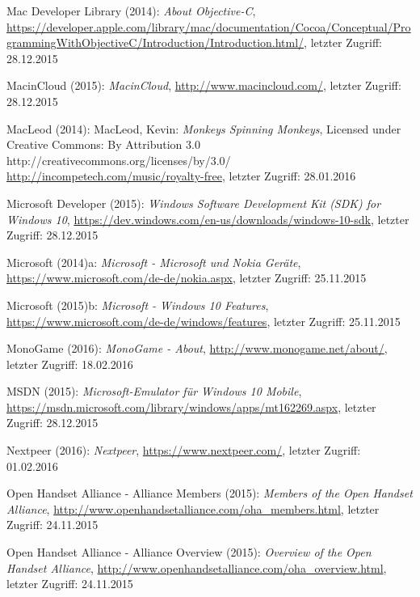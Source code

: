 \begin{thebibliography}{}
Mac Developer Library (2014): \emph{About Objective-C},
\url{https://developer.apple.com/library/mac/documentation/Cocoa/Conceptual/ProgrammingWithObjectiveC/Introduction/Introduction.html/}, letzter Zugriff: 28.12.2015

MacinCloud (2015): \emph{MacinCloud},
\url{http://www.macincloud.com/}, letzter Zugriff: 28.12.2015

MacLeod (2014): MacLeod, Kevin:
\emph{Monkeys Spinning Monkeys},
Licensed under Creative Commons: By Attribution 3.0
http://creativecommons.org/licenses/by/3.0/
\url{http://incompetech.com/music/royalty-free}, letzter Zugriff: 28.01.2016

Microsoft Developer (2015): \emph{Windows Software Development Kit (SDK) for Windows 10},
\url{https://dev.windows.com/en-us/downloads/windows-10-sdk}, letzter Zugriff: 28.12.2015

Microsoft (2014)a: \emph{Microsoft - Microsoft und Nokia Geräte},
\url{https://www.microsoft.com/de-de/nokia.aspx}, letzter Zugriff: 25.11.2015

Microsoft (2015)b: \emph{Microsoft - Windows 10 Features},
\url{https://www.microsoft.com/de-de/windows/features}, letzter Zugriff: 25.11.2015

MonoGame (2016): \emph{MonoGame - About},
\url{http://www.monogame.net/about/}, letzter Zugriff: 18.02.2016

MSDN (2015): \emph{Microsoft-Emulator für Windows 10 Mobile},
\url{https://msdn.microsoft.com/library/windows/apps/mt162269.aspx}, letzter Zugriff: 28.12.2015

Nextpeer (2016): \emph{Nextpeer},
\url{https://www.nextpeer.com/}, letzter Zugriff: 01.02.2016

Open Handset Alliance - Alliance Members (2015): \emph{Members of the Open Handset Alliance},
\url{http://www.openhandsetalliance.com/oha_members.html}, letzter Zugriff: 24.11.2015

Open Handset Alliance - Alliance Overview (2015): \emph{Overview of the Open Handset Alliance},
\url{http://www.openhandsetalliance.com/oha_overview.html}, letzter Zugriff: 24.11.2015


\end{thebibliography}
